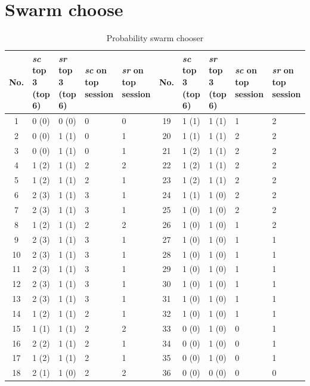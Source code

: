 \section{Swarm choose}
\begin{table}[h]
	\centering
	\caption{Probability swarm chooser}
	\begin{adjustwidth}{-2.5cm}{}
		\begin{tabular}{|c|p{1.5cm}|p{1.5cm}|p{1.5cm}|p{1.5cm}||c|p{1.5cm}|p{1.5cm}|p{1.5cm}|p{1.5cm}|}
			\hline
			\rowcolor[HTML]{EFEFEF} 
			No. & \textit{sc} top 3 (top 6) & \textit{sr} top 3 (top 6) & \textit{sc} on top session & \textit{sr} on top session & No. & \textit{sc} top 3 (top 6) & \textit{sr} top 3 (top 6) & \textit{sc} on top session & \textit{sr} on top session \\ \hline
			1 & 0  (0) & 0  (0) & 0 & 0 & 19 & 1  (1) & 1  (1) & 1 & 2\\ \hline
			2 & 0  (0) & 1  (1) & 0 & 1 & 20 & 1  (1) & 1  (1) & 2 & 2\\ \hline
			3 & 0  (0) & 1  (1) & 0 & 1 & 21 & 1  (2) & 1  (1) & 2 & 2\\ \hline
			4 & 1  (2) & 1  (1) & 2 & 2 & 22 & 1  (2) & 1  (1) & 2 & 2\\ \hline
			5 & 1  (2) & 1  (1) & 2 & 1 & 23 & 1  (2) & 1  (1) & 2 & 2\\ \hline
			6 & 2  (3) & 1  (1) & 3 & 1 & 24 & 1  (1) & 1  (0) & 2 & 2\\ \hline
			7 & 2  (3) & 1  (1) & 3 & 1 & 25 & 1  (0) & 1  (0) & 2 & 2\\ \hline
			8 & 1  (2) & 1  (1) & 2 & 2 & 26 & 1  (0) & 1  (0) & 1 & 2\\ \hline
			9 & 2  (3) & 1  (1) & 3 & 1 & 27 & 1  (0) & 1  (0) & 1 & 1\\ \hline
			10 & 2  (3) & 1  (1) & 3 & 1 & 28 & 1  (0) & 1  (0) & 1 & 1\\ \hline
			11 & 2  (3) & 1  (1) & 3 & 1 & 29 & 1  (0) & 1  (0) & 1 & 1\\ \hline
			12 & 2  (3) & 1  (1) & 3 & 1 & 30 & 1  (0) & 1  (0) & 1 & 1\\ \hline
			13 & 2  (3) & 1  (1) & 3 & 1 & 31 & 1  (0) & 1  (0) & 1 & 1\\ \hline
			14 & 1  (2) & 1  (1) & 2 & 1 & 32 & 1  (0) & 1  (0) & 1 & 1\\ \hline
			15 & 1  (1) & 1  (1) & 2 & 2 & 33 & 0  (0) & 1  (0) & 0 & 1\\ \hline
			16 & 2  (2) & 1  (1) & 2 & 1 & 34 & 0  (0) & 1  (0) & 0 & 1\\ \hline
			17 & 1  (2) & 1  (1) & 2 & 1 & 35 & 0  (0) & 1  (0) & 0 & 1\\ \hline
			18 & 2  (1) & 1  (0) & 2 & 2 & 36 & 0  (0) & 0  (0) & 0 & 0\\ \hline
		\end{tabular}
	\end{adjustwidth}
\end{table}

